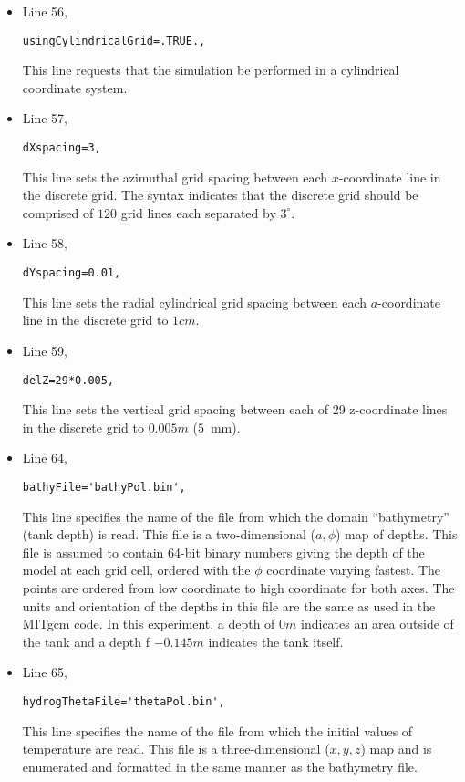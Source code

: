 \begin{itemize}
\item Line 56,
\begin{verbatim}
usingCylindricalGrid=.TRUE.,
\end{verbatim}
This line requests that the simulation be performed in a 
cylindrical coordinate system.

\item Line 57,
\begin{verbatim}
dXspacing=3,
\end{verbatim}
This line sets the azimuthal grid spacing between each $x$-coordinate line
in the discrete grid. The syntax indicates that the discrete grid
should be comprised of $120$ grid lines each separated by $3^{\circ}$.
                                                                               

\item Line 58,
\begin{verbatim}
dYspacing=0.01,
\end{verbatim}

This line sets the radial cylindrical grid spacing between each
$a$-coordinate line in the discrete grid to $1cm$.

\item Line 59,
\begin{verbatim}
delZ=29*0.005,
\end{verbatim}

This line sets the vertical grid spacing between each of 29
z-coordinate lines in the discrete grid to $0.005m$ ($5$~mm).

\item Line 64,
\begin{verbatim}
bathyFile='bathyPol.bin',
\end{verbatim}
This line specifies the name of the file from which the domain
``bathymetry'' (tank depth) is read. This file is a two-dimensional 
($a,\phi$) map of
depths. This file is assumed to contain 64-bit binary numbers 
giving the depth of the model at each grid cell, ordered with the $\phi$ 
coordinate varying fastest. The points are ordered from low coordinate
to high coordinate for both axes.  The units and orientation of the
depths in this file are the same as used in the MITgcm code. In this
experiment, a depth of $0m$ indicates an area outside of the tank
and a depth
f $-0.145m$ indicates the tank itself. 

\item Line 65,
\begin{verbatim}
hydrogThetaFile='thetaPol.bin',
\end{verbatim}
This line specifies the name of the file from which the initial values 
of temperature
are read. This file is a three-dimensional
($x,y,z$) map and is enumerated and formatted in the same manner as the 
bathymetry file. 


\end{itemize}
